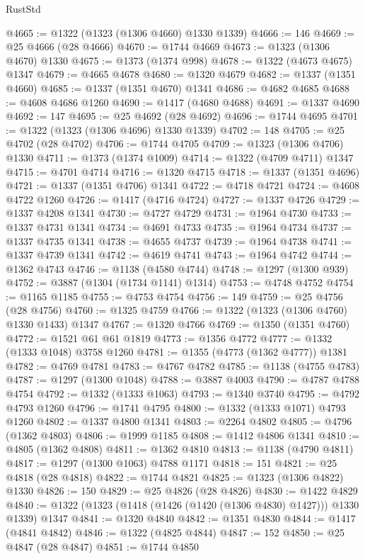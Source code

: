 \begin{lexlean}{RustStd}
\begin{coremodule}
{\begin{coremodule}
{{{{{{{{{{{{{{{{{{{{{{{{{{{{{{{{{{@4665 := @1322 (@1323 (@1306 @4660) @1330 @1339)
@4666 := 146
@4669 := @25 @4666 (@28 @4666)
@4670 := @1744 @4669
@4673 := @1323 (@1306 @4670) @1330
@4675 := @1373 (@1374 @998)
@4678 := @1322 (@4673 @4675) @1347
@4679 := @4665 @4678
@4680 := @1320 @4679
@4682 := @1337 (@1351 @4660)
@4685 := @1337 (@1351 @4670) @1341
@4686 := @4682 @4685
@4688 := @4608 @4686 @1260
@4690 := @1417 (@4680 @4688)
@4691 := @1337 @4690
@4692 := 147
@4695 := @25 @4692 (@28 @4692)
@4696 := @1744 @4695
@4701 := @1322 (@1323 (@1306 @4696) @1330 @1339)
@4702 := 148
@4705 := @25 @4702 (@28 @4702)
@4706 := @1744 @4705
@4709 := @1323 (@1306 @4706) @1330
@4711 := @1373 (@1374 @1009)
@4714 := @1322 (@4709 @4711) @1347
@4715 := @4701 @4714
@4716 := @1320 @4715
@4718 := @1337 (@1351 @4696)
@4721 := @1337 (@1351 @4706) @1341
@4722 := @4718 @4721
@4724 := @4608 @4722 @1260
@4726 := @1417 (@4716 @4724)
@4727 := @1337 @4726
@4729 := @1337 @4208 @1341
@4730 := @4727 @4729
@4731 := @1964 @4730
@4733 := @1337 @4731 @1341
@4734 := @4691 @4733
@4735 := @1964 @4734
@4737 := @1337 @4735 @1341
@4738 := @4655 @4737
@4739 := @1964 @4738
@4741 := @1337 @4739 @1341
@4742 := @4619 @4741
@4743 := @1964 @4742
@4744 := @1362 @4743
@4746 := @1138 (@4580 @4744)
@4748 := @1297 (@1300 @939)
@4752 := @3887 (@1304 (@1734 @1141) @1314)
@4753 := @4748 @4752
@4754 := @1165 @1185
@4755 := @4753 @4754
@4756 := 149
@4759 := @25 @4756 (@28 @4756)
@4760 := @1325 @4759
@4766 := @1322 (@1323 (@1306 @4760) @1330 @1433) @1347
@4767 := @1320 @4766
@4769 := @1350 (@1351 @4760)
@4772 := @1521 @61 @61 @1819
@4773 := @1356 @4772
@4777 := @1332 (@1333 @1048) @3758 @1260
@4781 := @1355 (@4773 (@1362 @4777)) @1381
@4782 := @4769 @4781
@4783 := @4767 @4782
@4785 := @1138 (@4755 @4783)
@4787 := @1297 (@1300 @1048)
@4788 := @3887 @4003
@4790 := @4787 @4788 @4754
@4792 := @1332 (@1333 @1063)
@4793 := @1340 @3740
@4795 := @4792 @4793 @1260
@4796 := @1741 @4795
@4800 := @1332 (@1333 @1071) @4793 @1260
@4802 := @1337 @4800 @1341
@4803 := @2264 @4802
@4805 := @4796 (@1362 @4803)
@4806 := @1999 @1185
@4808 := @1412 @4806 @1341
@4810 := @4805 (@1362 @4808)
@4811 := @1362 @4810
@4813 := @1138 (@4790 @4811)
@4817 := @1297 (@1300 @1063) @4788 @1171
@4818 := 151
@4821 := @25 @4818 (@28 @4818)
@4822 := @1744 @4821
@4825 := @1323 (@1306 @4822) @1330
@4826 := 150
@4829 := @25 @4826 (@28 @4826)
@4830 := @1422 @4829
@4840 := @1322 (@1323 (@1418 (@1426 (@1420 (@1306 @4830) @1427))) @1330 @1339) @1347
@4841 := @1320 @4840
@4842 := @1351 @4830
@4844 := @1417 (@4841 @4842)
@4846 := @1322 (@4825 @4844)
@4847 := 152
@4850 := @25 @4847 (@28 @4847)
@4851 := @1744 @4850
}}}}}}}}}}}}}}}}}}}}}}}}}}}}}}}}}}
\end{coremodule}}
\end{coremodule}
\end{lexlean}
